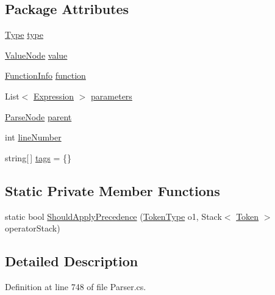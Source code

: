 \subsection*{Package Attributes}
\begin{DoxyCompactItemize}
\item 
\hyperlink{a00104_aceddb5496ccffe668bced2d131e4bf86}{Type} \hyperlink{a00104_ad55c92df835006328bc2a79a8f91efb9}{type}
\item 
\hyperlink{a00188}{Value\-Node} \hyperlink{a00104_a569e516782891544c334ff8131b23108}{value}
\item 
\hyperlink{a00106}{Function\-Info} \hyperlink{a00104_a9c1859ce5ad4c86ded8dd0d61da61320}{function}
\item 
List$<$ \hyperlink{a00104}{Expression} $>$ \hyperlink{a00104_a7b21380bead8ae08b2cfc6594edab32c}{parameters}
\item 
\hyperlink{a00148}{Parse\-Node} \hyperlink{a00148_af313a82103fcc2ff5a177dbb06b92f7b}{parent}
\item 
int \hyperlink{a00148_a18b493382de0fde5b4299c1bd2250075}{line\-Number}
\item 
string\mbox{[}$\,$\mbox{]} \hyperlink{a00148_a58b3a15788fd2d4127d73619dc6d04ae}{tags} = \{\}
\end{DoxyCompactItemize}
\subsection*{Static Private Member Functions}
\begin{DoxyCompactItemize}
\item 
static bool \hyperlink{a00104_a5004a8eaa00b2b55856ecb4f339033fb}{Should\-Apply\-Precedence} (\hyperlink{a00051_a301aa7c866593a5b625a8fc158bbeace}{Token\-Type} o1, Stack$<$ \hyperlink{a00173}{Token} $>$ operator\-Stack)
\end{DoxyCompactItemize}


\subsection{Detailed Description}


Definition at line 748 of file Parser.\-cs.




